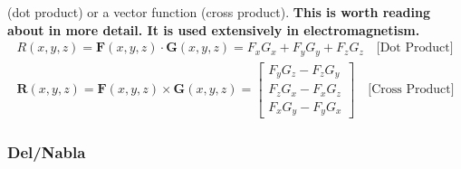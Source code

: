 \begin{enumerate}
\begin{enumerate}
          (dot product) or a vector function (cross product). \textbf{This
          is worth reading about in more detail. It is used extensively
          in electromagnetism.}
          \begin{align*}
            R(x, y, z) = \mathbf{F}(x, y, z) \cdot \mathbf{G}(x, y, z)
            = F_x G_x + F_y G_y + F_z G_z \hspace{1em} \text{[Dot Product]} \\
            \mathbf{R}(x, y, z) = \mathbf{F}(x, y, z) \times \mathbf{G}(x, y, z)
                        = \begin{bmatrix}
                            F_y G_z - F_z G_y \\
                            F_z G_x - F_x G_z \\
                            F_x G_y - F_y G_x
                          \end{bmatrix} \hspace{1em} \text{[Cross Product]}
          \end{align*}
      \end{enumerate}
\end{enumerate}

\subsubsection{Del/Nabla}

